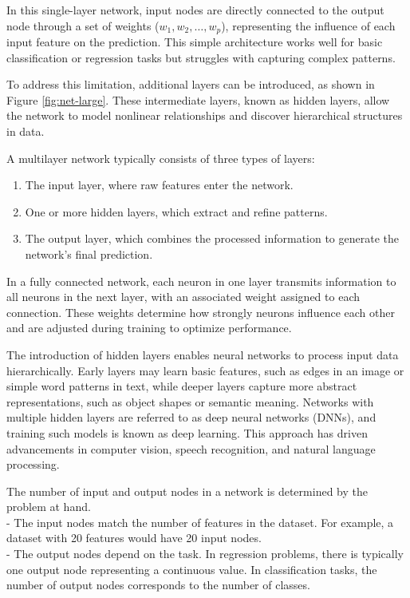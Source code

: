 \documentclass[
]{book}
\providecommand{\tightlist}{%
  \setlength{\itemsep}{0pt}\setlength{\parskip}{0pt}}
\theoremstyle{definition}
\theoremstyle{definition}
\theoremstyle{definition}
\theoremstyle{definition}
\theoremstyle{remark}
\begin{document}
In this single-layer network, input nodes are directly connected to the output node through a set of weights (\(w_1, w_2, \dots, w_p\)), representing the influence of each input feature on the prediction. This simple architecture works well for basic classification or regression tasks but struggles with capturing complex patterns.

To address this limitation, additional layers can be introduced, as shown in Figure \ref{fig:net-large}. These intermediate layers, known as hidden layers, allow the network to model nonlinear relationships and discover hierarchical structures in data.

A multilayer network typically consists of three types of layers:

\begin{enumerate}
\def\labelenumi{\arabic{enumi}.}
\tightlist
\item
  The input layer, where raw features enter the network.\\
\item
  One or more hidden layers, which extract and refine patterns.\\
\item
  The output layer, which combines the processed information to generate the network's final prediction.
\end{enumerate}

In a fully connected network, each neuron in one layer transmits information to all neurons in the next layer, with an associated weight assigned to each connection. These weights determine how strongly neurons influence each other and are adjusted during training to optimize performance.

The introduction of hidden layers enables neural networks to process input data hierarchically. Early layers may learn basic features, such as edges in an image or simple word patterns in text, while deeper layers capture more abstract representations, such as object shapes or semantic meaning. Networks with multiple hidden layers are referred to as deep neural networks (DNNs), and training such models is known as deep learning. This approach has driven advancements in computer vision, speech recognition, and natural language processing.

The number of input and output nodes in a network is determined by the problem at hand.\\
- The input nodes match the number of features in the dataset. For example, a dataset with 20 features would have 20 input nodes.\\
- The output nodes depend on the task. In regression problems, there is typically one output node representing a continuous value. In classification tasks, the number of output nodes corresponds to the number of classes.
\end{document}
